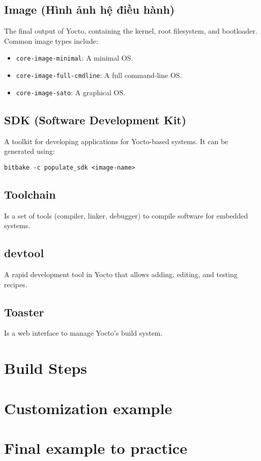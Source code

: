 \documentclass{article}
\begin{document}
\subsection{Image (Hình ảnh hệ điều hành)}
The final output of Yocto, containing the kernel, root filesystem, and bootloader. Common image types include:
\begin{itemize}
    \item \texttt{core-image-minimal}: A minimal OS.
    \item \texttt{core-image-full-cmdline}: A full command-line OS.
    \item \texttt{core-image-sato}: A graphical OS.
\end{itemize}

\subsection{SDK (Software Development Kit)}
A toolkit for developing applications for Yocto-based systems. It can be generated using:
\begin{verbatim}
bitbake -c populate_sdk <image-name>
\end{verbatim}

\subsection{Toolchain}
Is a set of tools (compiler, linker, debugger) to compile software for embedded systems.

\subsection{devtool}
A rapid development tool in Yocto that allows adding, editing, and testing recipes.

\subsection{Toaster}
Is a web interface to manage Yocto's build system.
\section{Build Steps} \label{sec:build-steps}
\section{Customization example} \label{sec:customization-examples}

\section{Final example to practice} \label{sec:final-example}




\end{document}
